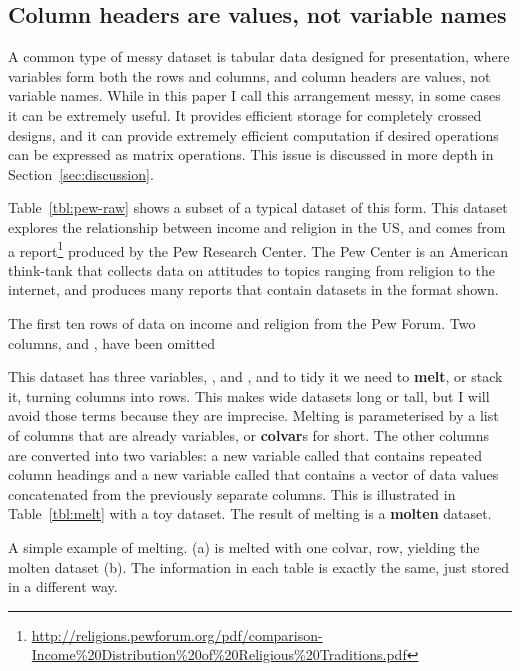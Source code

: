 \documentclass[article]{jss}
\begin{document}
\subsection{Column headers are values, not variable names}

A common type of messy dataset is tabular data designed for presentation, where variables form both the rows and columns, and column headers are values, not variable names. While in this paper I call this arrangement messy, in some cases it can be extremely useful. It provides efficient storage for completely crossed designs, and it can provide extremely efficient computation if desired operations can be expressed as matrix operations. This issue is discussed in more depth in Section~\ref{sec:discussion}.

Table~\ref{tbl:pew-raw} shows a subset of a typical dataset of this form. This dataset explores the relationship between income and religion in the US, and comes from a report\footnote{\url{http://religions.pewforum.org/pdf/comparison-Income\%20Distribution\%20of\%20Religious\%20Traditions.pdf}} produced by the Pew Research Center. The Pew Center is an American think-tank that collects data on attitudes to topics ranging from religion to the internet, and produces many reports that contain datasets in the format shown.

\begin{table}[htbp]
  \centering
  
  \caption{The first ten rows of data on income and religion from the Pew Forum. Two columns,  and , have been omitted} 
  \label{tbl:pew-raw}
\end{table}

This dataset has three variables, ,  and , and to tidy it we need to \textbf{melt}, or stack it, turning columns into rows. This makes wide datasets long or tall, but I will avoid those terms because they are imprecise. Melting is parameterised by a list of columns that are already variables, or \textbf{colvar}s for short. The other columns are converted into two variables: a new variable called  that contains repeated column headings and a new variable called  that contains a vector of data values concatenated from the previously separate columns. This is illustrated in Table~\ref{tbl:melt} with a toy dataset. The result of melting is a \textbf{molten} dataset.

\begin{table}
  \centering
  \hspace{2em}%

  \caption{A simple example of melting. (a) is melted with one colvar, row, yielding the molten dataset (b). The information in each table is exactly the same, just stored in a different way.}
  \label{tbl:melt} 
\end{table}
\end{document}
